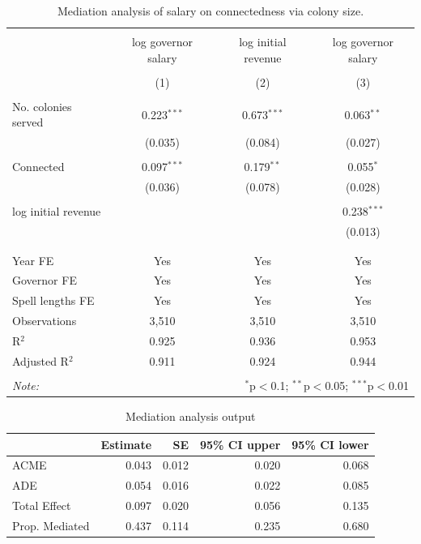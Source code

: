 \documentclass[a4paper]{article}\usepackage[]{graphicx}\usepackage[]{color}
\begin{document}
\begin{table}[!htbp] \centering 
  \caption{Mediation analysis of salary on connectedness via colony size.} 
  \label{tab:mediation1} 
\scriptsize 
\begin{tabular}{@{\extracolsep{5pt}}lccc} 
\\[-1.8ex]\hline 
\hline \\[-1.8ex] 
 & log governor salary & log initial revenue & log governor salary \\ 
\\[-1.8ex] & (1) & (2) & (3)\\ 
\hline \\[-1.8ex] 
 No. colonies served & 0.223$^{***}$ & 0.673$^{***}$ & 0.063$^{**}$ \\ 
  & (0.035) & (0.084) & (0.027) \\ 
  & & & \\ 
 Connected & 0.097$^{***}$ & 0.179$^{**}$ & 0.055$^{*}$ \\ 
  & (0.036) & (0.078) & (0.028) \\ 
  & & & \\ 
 log initial revenue &  &  & 0.238$^{***}$ \\ 
  &  &  & (0.013) \\ 
  & & & \\ 
\hline \\[-1.8ex] 
Year FE & Yes & Yes & Yes \\ 
Governor FE & Yes & Yes & Yes \\ 
Spell lengths FE & Yes & Yes & Yes \\ 
Observations & 3,510 & 3,510 & 3,510 \\ 
R$^{2}$ & 0.925 & 0.936 & 0.953 \\ 
Adjusted R$^{2}$ & 0.911 & 0.924 & 0.944 \\ 
\hline 
\hline \\[-1.8ex] 
\textit{Note:}  & \multicolumn{3}{r}{$^{*}$p$<$0.1; $^{**}$p$<$0.05; $^{***}$p$<$0.01} \\ 
\end{tabular} 
\end{table} 
\begin{table}[!h]

\caption{\label{tab:mediation2}Mediation analysis output}
\centering
\fontsize{7}{9}\selectfont
\begin{tabular}[t]{lrrrr}
\toprule
  & Estimate & SE & 95\% CI upper & 95\% CI lower\\
\midrule
ACME & 0.043 & 0.012 & 0.020 & 0.068\\
ADE & 0.054 & 0.016 & 0.022 & 0.085\\
Total Effect & 0.097 & 0.020 & 0.056 & 0.135\\
Prop. Mediated & 0.437 & 0.114 & 0.235 & 0.680\\
\bottomrule
\end{tabular}
\end{table}
\end{document}
